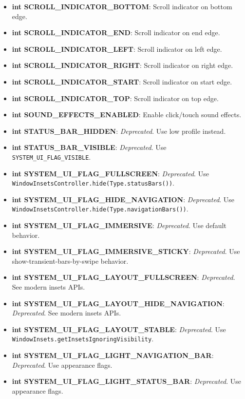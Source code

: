 \documentclass{report}
\begin{document}
\begin{itemize}
\begin{itemize}
                \item \textbf{int SCROLL\_INDICATOR\_BOTTOM}: Scroll indicator on bottom edge.
                \item \textbf{int SCROLL\_INDICATOR\_END}: Scroll indicator on end edge.
                \item \textbf{int SCROLL\_INDICATOR\_LEFT}: Scroll indicator on left edge.
                \item \textbf{int SCROLL\_INDICATOR\_RIGHT}: Scroll indicator on right edge.
                \item \textbf{int SCROLL\_INDICATOR\_START}: Scroll indicator on start edge.
                \item \textbf{int SCROLL\_INDICATOR\_TOP}: Scroll indicator on top edge.
                \item \textbf{int SOUND\_EFFECTS\_ENABLED}: Enable click/touch sound effects.
                \item \textbf{int STATUS\_BAR\_HIDDEN}: \textit{Deprecated}. Use low profile instead.
                \item \textbf{int STATUS\_BAR\_VISIBLE}: \textit{Deprecated}. Use \texttt{SYSTEM\_UI\_FLAG\_VISIBLE}.
                \item \textbf{int SYSTEM\_UI\_FLAG\_FULLSCREEN}: \textit{Deprecated}. Use \texttt{WindowInsetsController.hide(Type.statusBars())}.
                \item \textbf{int SYSTEM\_UI\_FLAG\_HIDE\_NAVIGATION}: \textit{Deprecated}. Use \texttt{WindowInsetsController.hide(Type.navigationBars())}.
                \item \textbf{int SYSTEM\_UI\_FLAG\_IMMERSIVE}: \textit{Deprecated}. Use default behavior.
                \item \textbf{int SYSTEM\_UI\_FLAG\_IMMERSIVE\_STICKY}: \textit{Deprecated}. Use show-transient-bars-by-swipe behavior.
                \item \textbf{int SYSTEM\_UI\_FLAG\_LAYOUT\_FULLSCREEN}: \textit{Deprecated}. See modern insets APIs.
                \item \textbf{int SYSTEM\_UI\_FLAG\_LAYOUT\_HIDE\_NAVIGATION}: \textit{Deprecated}. See modern insets APIs.
                \item \textbf{int SYSTEM\_UI\_FLAG\_LAYOUT\_STABLE}: \textit{Deprecated}. Use \texttt{WindowInsets.getInsetsIgnoringVisibility}.
                \item \textbf{int SYSTEM\_UI\_FLAG\_LIGHT\_NAVIGATION\_BAR}: \textit{Deprecated}. Use appearance flags.
                \item \textbf{int SYSTEM\_UI\_FLAG\_LIGHT\_STATUS\_BAR}: \textit{Deprecated}. Use appearance flags.

\end{itemize}
\end{itemize}
\end{document}
